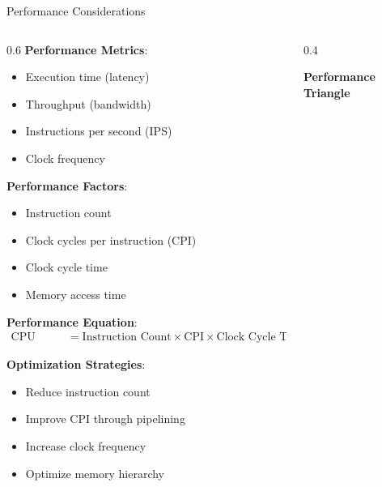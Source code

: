 \documentclass[aspectratio=169]{beamer}
\newcommand{\concept}[1]{\textbf{\color{darkblue}#1}}
\begin{document}
\begin{frame}{Performance Considerations}
\begin{columns}
\begin{column}{0.6\textwidth}
\concept{Performance Metrics}:
\begin{itemize}
\item Execution time (latency)
\item Throughput (bandwidth)
\item Instructions per second (IPS)
\item Clock frequency
\end{itemize}

\vspace{0.3cm}
\concept{Performance Factors}:
\begin{itemize}
\item Instruction count
\item Clock cycles per instruction (CPI)
\item Clock cycle time
\item Memory access time
\end{itemize}

\vspace{0.3cm}
\concept{Performance Equation}:
\begin{align}
\text{CPU Time} &= \text{Instruction Count} \times \text{CPI} \times \text{Clock Cycle Time}
\end{align}

\vspace{0.3cm}
\concept{Optimization Strategies}:
\begin{itemize}
\item Reduce instruction count
\item Improve CPI through pipelining
\item Increase clock frequency
\item Optimize memory hierarchy
\end{itemize}
\end{column}
\begin{column}{0.4\textwidth}
\begin{center}
\textbf{Performance Triangle}
\vspace{0.3cm}

\end{center}
\end{column}
\end{columns}
\end{frame}
\end{document}
